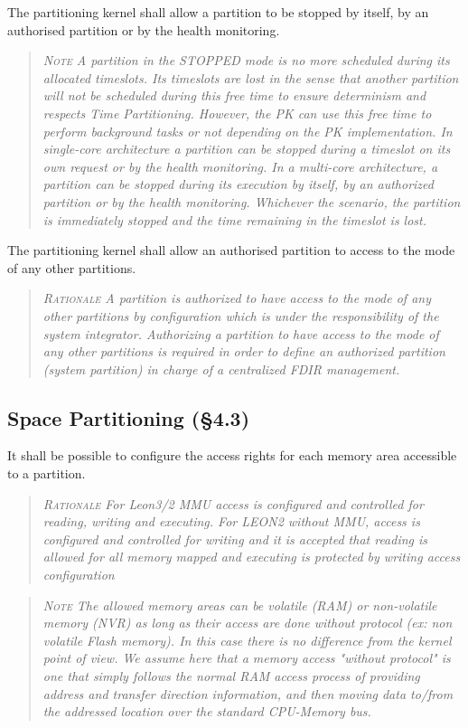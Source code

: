 The partitioning kernel shall allow a partition to be stopped by itself, by an authorised partition or by the health monitoring.
\begin{quote}\it
\textsc{Note}
A partition in the STOPPED mode is no more scheduled during its allocated timeslots. Its  timeslots are lost in the sense that another partition will not be scheduled during this free time to ensure determinism and respects Time Partitioning. However, the PK can use this free time to perform background tasks or not depending on the PK implementation.  In single-core architecture a partition can be stopped during a timeslot on its own request or by the health monitoring. In a multi-core architecture, a partition can be stopped during its execution by itself, by an authorized partition or by the health monitoring. Whichever the scenario, the partition is immediately stopped and the time remaining in the timeslot is lost.
\end{quote}

The partitioning kernel shall allow an authorised partition to access to the mode of any other partitions.
\begin{quote}\it
\textsc{Rationale}
A partition is authorized to have access to the mode of any other partitions by configuration which is under the responsibility of the system integrator. Authorizing a partition to have access to the mode of any other partitions is required in order to define an authorized partition (system partition) in charge of a centralized FDIR management.
\end{quote}

\subsection{Space Partitioning (\S4.3)}

It shall be possible to configure the access rights for each memory area accessible to a partition.
\begin{quote}\it
\textsc{Rationale}
For Leon3/2 MMU access is configured and controlled for reading, writing and executing.  For LEON2 without MMU, access is configured and controlled for writing and it is accepted that reading is allowed for all memory mapped and executing is protected by writing access configuration
\end{quote}
\begin{quote}\it
\textsc{Note}
The allowed memory areas can be volatile (RAM) or non-volatile memory (NVR) as long as their access are done without protocol (ex: non volatile Flash memory). In this case there is no difference from the kernel point of view.
We assume here that a memory access "without protocol" is one that simply follows the normal RAM access process of providing address and transfer direction information, and then moving data to/from the addressed location over the standard CPU-Memory bus.
\end{quote}

